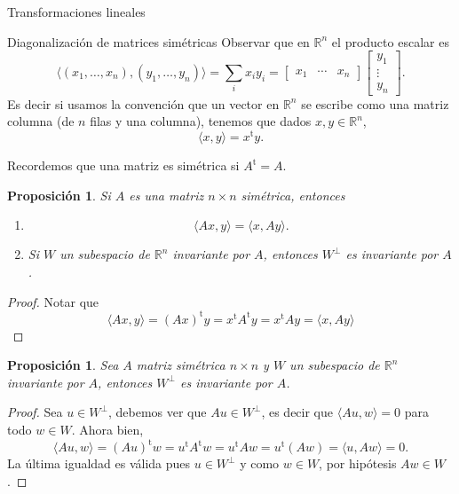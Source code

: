 \documentclass[a4paper,12pt,twoside,spanish,reqno]{amsbook}
\numberwithin{equation}{section}
\newtheorem{proposicion}[teorema]{Proposici\'on}
\theoremstyle{definition}
\theoremstyle{remark}
\newcommand{\la}{\langle}
\newcommand{\ra}{\rangle}
\renewcommand{\t}{{\operatorname{t}}}
\newcommand{\R}{\mathbb R}
\begin{document}
\begin{chapter}{Transformaciones lineales}
\begin{section}{Diagonalización de matrices simétricas}
    Observar que en $\R^n$ el producto escalar es 
    \begin{equation*}
        \la (x_1,\ldots,x_n),(y_1,\ldots,y_n)  \ra = \sum_i x_iy_i = \begin{bmatrix} x_1& \cdots &x_n\end{bmatrix}\begin{bmatrix} y_1 \\ \vdots \\ y_n \end{bmatrix}.
    \end{equation*}
    Es decir si usamos la convención que un vector en $\R^n$  se escribe como una matriz columna (de $n$ filas y una columna),  tenemos que dados $x,y \in \R^n$, 
    \begin{equation*}
        \la x,y \ra = x^\t y.
    \end{equation*}
    
    Recordemos que una matriz es simétrica si $A^\t =A$. 
    
\begin{proposicion}
    Si $A$ es una matriz $n \times n$ simétrica, entonces 
    \begin{enumerate}[label=\emph{\alph*})]
        \item 
        \begin{equation*}
        \la Ax,y \ra =  \la x,Ay \ra .
        \end{equation*}
        \item Si $W$ un subespacio de $\R^n$ invariante por $A$, entonces $W^\perp$ es invariante por $A$.
    \end{enumerate}
\end{proposicion}
\begin{proof}
    Notar que
    \begin{equation*}
    \la Ax,y \ra = (Ax)^\t y = x^\t A^\t y  = x^\t A y = \la x,Ay \ra 
    \end{equation*}
\end{proof}
    
    
    
    \begin{proposicion}\label{wperpinv}
        Sea $A$ matriz simétrica $n \times n$ y $W$ un subespacio de $\R^n$ invariante por $A$, entonces $W^\perp$ es invariante por $A$.
    \end{proposicion}
    \begin{proof}
        Sea $u \in W^\perp$,  debemos ver que $Au \in W^\perp$,  es decir que $\la Au,w\ra =0$ para todo $w \in W$. Ahora bien,
        \begin{equation*}
            \la Au,w\ra =(Au)^\t w = u^\t A^\t w =u^\t A w = u^\t (A w) = \la u, Aw\ra=0.  
        \end{equation*}
        La última igualdad es válida pues $u \in W^\perp$ y  como $w \in W$, por hipótesis $Aw \in W$.
    \end{proof}
    

\end{section}
\end{chapter}
\end{document}
